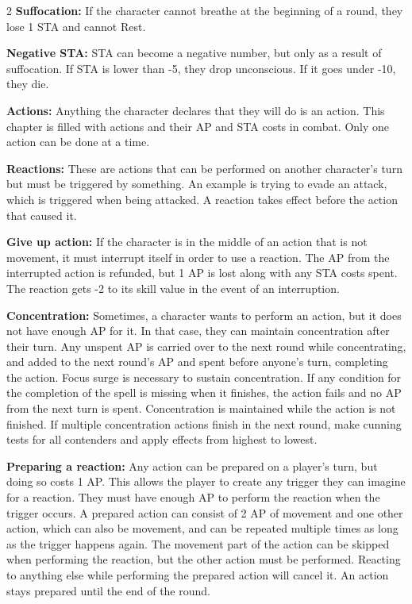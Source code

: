 \begin{multicols}{2}
\textbf{Suffocation:} If the character cannot breathe at the beginning of a round, they lose 1 STA and cannot Rest. 

\textbf{Negative STA:} STA can become a negative number, but only as a result of suffocation. If STA is lower than -5, they drop unconscious. If it goes under -10, they die.

\textbf{Actions:} Anything the character declares that they will do is an action. This chapter is filled with actions and their AP and STA costs in combat. Only one action can be done at a time.

\textbf{Reactions:} These are actions that can be performed on another character's turn but must be triggered by something. An example is trying to evade an attack, which is triggered when being attacked. A reaction takes effect before the action that caused it. 

\textbf{Give up action:} If the character is in the middle of an action that is not movement, it must interrupt itself in order to use a reaction. The AP from the interrupted action is refunded, but 1 AP is lost along with any STA costs spent. The reaction gets -2 to its skill value in the event of an interruption. 

\textbf{Concentration:} Sometimes, a character wants to perform an action, but it does not have enough AP for it. In that case, they can maintain concentration after their turn. Any unspent AP is carried over to the next round while concentrating, and added to the next round's AP and spent before anyone's turn, completing the action. Focus surge is necessary to sustain concentration. If any condition for the completion of the spell is missing when it finishes, the action fails and no AP from the next turn is spent. Concentration is maintained while the action is not finished. If multiple concentration actions finish in the next round, make cunning tests for all contenders and apply effects from highest to lowest.

\textbf{Preparing a reaction:} Any action can be prepared on a player's turn, but doing so costs 1 AP. This allows the player to create any trigger they can imagine for a reaction. They must have enough AP to perform the reaction when the trigger occurs. A prepared action can consist of 2 AP of movement and one other action, which can also be movement, and can be repeated multiple times as long as the trigger happens again. The movement part of the action can be skipped when performing the reaction, but the other action must be performed. Reacting to anything else while performing the prepared action will cancel it. An action stays prepared until the end of the round.


\end{multicols}
